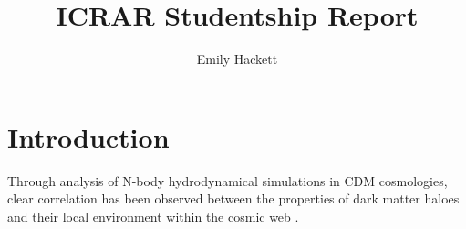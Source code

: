 \documentclass[a4paper,fleqn,usenatbib,useAMS]{mnras}
\title[ICRAR Report]{ICRAR Studentship Report}
\author[E. Hackett]{Emily Hackett}
\begin{document}
\label{firstpage}
\maketitle

\section{Introduction}
Through analysis of N-body hydrodynamical simulations in CDM cosmologies, clear correlation has been observed between the properties of dark matter haloes and their local environment within the cosmic web \cite{lemson99}.



\end{document}
